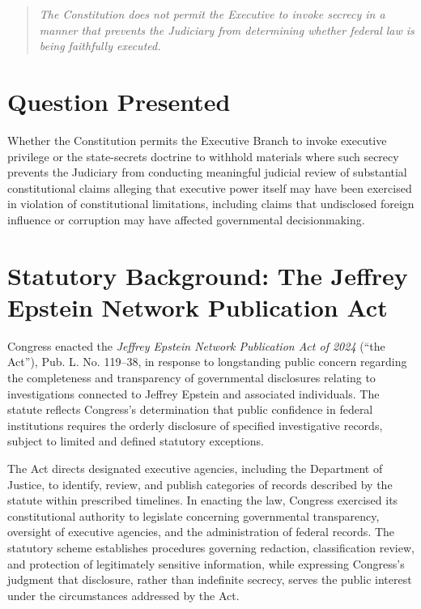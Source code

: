 \documentclass[12pt]{article}
\begin{document}
\begin{quote}
\emph{The Constitution does not permit the Executive to invoke secrecy in a manner that prevents the Judiciary from determining whether federal law is being faithfully executed.}
\end{quote}

\section*{Question Presented}
Whether the Constitution permits the Executive Branch to invoke executive privilege or the state-secrets doctrine to withhold materials where such secrecy prevents the Judiciary from conducting meaningful judicial review of substantial constitutional claims alleging that executive power itself may have been exercised in violation of constitutional limitations, including claims that undisclosed foreign influence or corruption may have affected governmental decisionmaking.

\section*{Statutory Background: The Jeffrey Epstein Network Publication Act}

Congress enacted the \emph{Jeffrey Epstein Network Publication Act of 2024} (“the Act”), Pub.
L. No. 119–38, in response to longstanding public concern regarding the completeness and transparency of governmental disclosures relating to investigations connected to Jeffrey Epstein and associated individuals.
The statute reflects Congress’s determination that public confidence in federal institutions requires the orderly disclosure of specified investigative records, subject to limited and defined statutory exceptions.

The Act directs designated executive agencies, including the Department of Justice, to identify, review, and publish categories of records described by the statute within prescribed timelines.
In enacting the law, Congress exercised its constitutional authority to legislate concerning governmental transparency, oversight of executive agencies, and the administration of federal records.
The statutory scheme establishes procedures governing redaction, classification review, and protection of legitimately sensitive information, while expressing Congress’s judgment that disclosure, rather than indefinite secrecy, serves the public interest under the circumstances addressed by the Act.
\end{document}
